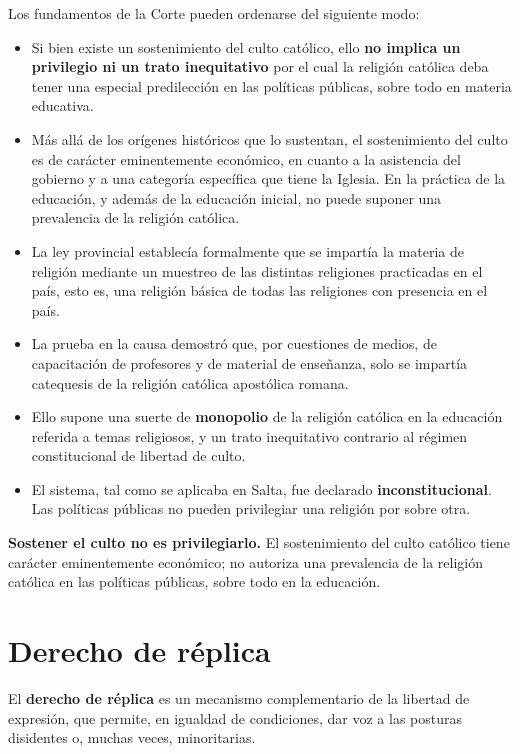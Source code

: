 \documentclass[12pt,oneside]{book}
\begin{document}
Los fundamentos de la Corte pueden ordenarse del siguiente modo:
\begin{itemize}
    \item Si bien existe un sostenimiento del culto católico, ello \textbf{no implica un privilegio ni un trato inequitativo} por el cual la religión católica deba tener una especial predilección en las políticas públicas, sobre todo en materia educativa.
    \item Más allá de los orígenes históricos que lo sustentan, el sostenimiento del culto es de carácter eminentemente económico, en cuanto a la asistencia del gobierno y a una categoría específica que tiene la Iglesia. En la práctica de la educación, y además de la educación inicial, no puede suponer una prevalencia de la religión católica.
    \item La ley provincial establecía formalmente que se impartía la materia de religión mediante un muestreo de las distintas religiones practicadas en el país, esto es, una religión básica de todas las religiones con presencia en el país.
    \item La prueba en la causa demostró que, por cuestiones de medios, de capacitación de profesores y de material de enseñanza, solo se impartía catequesis de la religión católica apostólica romana.
    \item Ello supone una suerte de \textbf{monopolio} de la religión católica en la educación referida a temas religiosos, y un trato inequitativo contrario al régimen constitucional de libertad de culto.
    \item El sistema, tal como se aplicaba en Salta, fue declarado \textbf{inconstitucional}. Las políticas públicas no pueden privilegiar una religión por sobre otra.
\end{itemize}

\begin{important}
\textbf{Sostener el culto no es privilegiarlo.} El sostenimiento del culto católico tiene carácter eminentemente económico; no autoriza una prevalencia de la religión católica en las políticas públicas, sobre todo en la educación.
\end{important}

\section{Derecho de réplica}

El \textbf{derecho de réplica} es un mecanismo complementario de la libertad de expresión, que permite, en igualdad de condiciones, dar voz a las posturas disidentes o, muchas veces, minoritarias.
\end{document}
